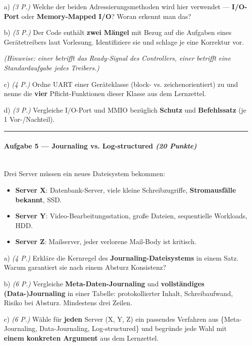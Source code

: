 \documentclass[11pt, a4paper]{article}
\begin{document}
a) \textit{(3 P.)} Welche der beiden Adressierungsmethoden wird hier verwendet — \textbf{I/O-Port} oder \textbf{Memory-Mapped I/O}? Woran erkennt man das?


b) \textit{(5 P.)} Der Code enthält \textbf{zwei Mängel} mit Bezug auf die Aufgaben eines Gerätetreibers laut Vorlesung. Identifiziere sie und schlage je eine Korrektur vor.

\textit{(Hinweise: einer betrifft das Ready-Signal des Controllers, einer betrifft eine Standardaufgabe jedes Treibers.)}


c) \textit{(4 P.)} Ordne UART einer Geräteklasse (block- vs. zeichenorientiert) zu und nenne die \textbf{vier} Pflicht-Funktionen dieser Klasse aus dem Lernzettel.


d) \textit{(3 P.)} Vergleiche I/O-Port und MMIO bezüglich \textbf{Schutz} und \textbf{Befehlssatz} (je 1 Vor-/Nachteil).



\noindent\textcolor{rulegray}{\rule{\linewidth}{0.4pt}}


\paragraph{Aufgabe 5 — Journaling vs. Log-structured \textit{(20 Punkte)}}\mbox{}\\[2pt]

Drei Server müssen ein neues Dateisystem bekommen:


\begin{itemize}
  \item \textbf{Server X}: Datenbank-Server, viele kleine Schreibzugriffe, \textbf{Stromausfälle bekannt}, SSD.
  \item \textbf{Server Y}: Video-Bearbeitungsstation, große Dateien, sequentielle Workloads, HDD.
  \item \textbf{Server Z}: Mailserver, jeder verlorene Mail-Body ist kritisch.
\end{itemize}

a) \textit{(4 P.)} Erkläre die Kernregel des \textbf{Journaling-Dateisystems} in einem Satz. Warum garantiert sie nach einem Absturz Konsistenz?


b) \textit{(6 P.)} Vergleiche \textbf{Meta-Daten-Journaling} und \textbf{vollständiges (Data-)Journaling} in einer Tabelle: protokollierter Inhalt, Schreibaufwand, Risiko bei Absturz. Mindestens drei Zeilen.


c) \textit{(6 P.)} Wähle für \textbf{jeden} Server (X, Y, Z) ein passendes Verfahren aus \{Meta-Journaling, Data-Journaling, Log-structured\} und begründe jede Wahl mit \textbf{einem konkreten Argument} aus dem Lernzettel.
\end{document}
